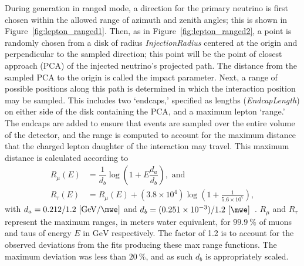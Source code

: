 \documentclass[main.tex]{subfiles}
\begin{document}
During generation in ranged mode, a direction for the primary neutrino is first chosen within the allowed range of azimuth and zenith angles; this is shown in Figure~\ref{fig:lepton_ranged1}.
Then, as in Figure~\ref{fig:lepton_ranged2}, a point is randomly chosen from a disk of radius \textit{InjectionRadius} centered at the origin and perpendicular to the sampled direction; this point will be the point of closest approach (PCA) of the injected neutrino's projected path.
The distance from the sampled PCA to the origin is called the impact parameter.
Next, a range of possible positions along this path is determined in which the interaction position may be sampled.
This includes two `endcaps,' specified as lengths (\textit{EndcapLength}) on either side of the disk containing the PCA, and a maximum lepton `range.'
The endcaps are added to ensure that events are sampled over the entire volume of the detector, and the range is computed to account for the maximum distance that the charged lepton daughter of the interaction may travel.
This maximum distance is calculated according to 
\begin{align}
R_{\mu}(E) &= \dfrac{1}{d_{b}}\log\left(1 + E\dfrac{d_{a}}{d_{b}}\right), \text{ and} \label{eq:dima1} \\
R_{\tau}(E) &= R_{\mu}(E) + \left(3.8\times 10^{4}\right)\log\left(1+\tfrac{1}{5.6\times 10^{7}}\right) \label{eq:dima2},
\end{align}
with $d_{a}=0.212/1.2~[\si{\GeV\per\mwe}]$ and $d_{b}=(0.251\times 10^{-3})/1.2~[\si{\per\mwe}]$~\cite{chirkin2004propagating}.
$R_{\mu}$ and $R_{\tau}$ represent the maximum ranges, in meters water equivalent, for $\SI{99.9}\percent$ of muons and taus of energy $E$ in $\si\GeV$ respectively. 
The factor of 1.2 is to account for the observed deviations from the fits producing these max range functions. 
The maximum deviation was less than $\SI{20}\percent$, and as such $d_{b}$ is appropriately scaled.
\end{document}
